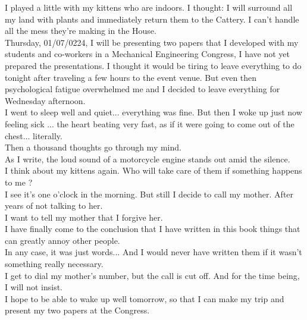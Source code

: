 \documentclass[11pt]{book}
\begin{document}
\noindent I played a little with my kittens who are indoors. I thought: I will surround all my land with plants and immediately return them to the Cattery. I can't handle all the mess they're making in the House. \\

\noindent Thursday, 01/07/0224, I will be presenting two papers that I developed with my students and co-workers in a Mechanical Engineering Congress, I have not yet prepared the presentations. I thought it would be tiring to leave everything to do tonight after traveling a few hours to the event venue. But even then psychological fatigue overwhelmed me and I decided to leave everything for Wednesday afternoon. \\

\noindent I went to sleep well and quiet... everything was fine. But then I woke up just now feeling sick ... the heart beating very fast, as if it were going to come out of the chest... literally. \\

\noindent Then a thousand thoughts go through my mind. \\

\noindent As I write, the loud sound of a motorcycle engine stands out amid the silence. \\

\noindent I think about my kittens again. Who will take care of them if something happens to me ? \\

\noindent I see it's one o'clock in the morning. But still I decide to call my mother. After years of not talking to her. \\ 

\noindent I want to tell my mother that I forgive her. \\

\noindent I have finally come to the conclusion that I have written in this book things that can greatly annoy other people. \\

\noindent In any case, it was just words... And I would never have written them if it wasn't something really necessary. \\

\noindent I get to dial my mother's number, but the call is cut off. And for the time being, I will not insist. \\

\noindent I hope to be able to wake up well tomorrow, so that I can make my trip and present my two papers at the Congress. \\
\end{document}
